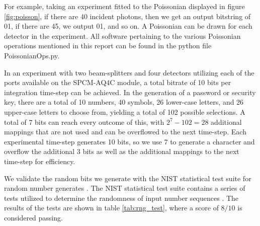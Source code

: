 \documentclass[letterpaper, 11 pt]{article}
\begin{document}
For example, taking an experiment fitted to the Poissonian displayed in figure
\ref{fig:poisson}, if there are 40 incident photons, then we get an output
bitstring of 01, if there are 45, we output 01, and so on. A Poissonian can be
drawn for each detector in the experiment. All software pertaining to the various
Poissonian operations mentioned in this report can be found in the python file PoissonianOps.py.

In an experiment with two beam-splitters and four detectors utilizing each of
the ports available on the SPCM-AQ4C module, a total bitrate of 10 bits per
integration time-step can be achieved. In the generation of a password or
security key, there are a total of 10 numbers, 40 symbols, 26 lower-case
letters, and 26 upper-case letters to choose from, yielding a total of 102
possible selections. A total of 7 bits can reach every outcome of
this, with $2^7 - 102 = 28$ additional mappings that are not used and can be
overflowed to the next time-step. Each experimental time-step generates 10 bits,
so we use 7 to generate a character and overflow the additional 3 bits as well
as the additional mappings to the next time-step for efficiency. 

We validate the random bits we generate with the NIST statistical test suite for
random number generates \cite{nist_sts}. The NIST statistical test suite contains a series of
tests utilized to determine the randomness of input number sequences \cite{sts_intro}. The
results of the tests are shown in table \ref{tab:rng_test}, where a score of
$8/10$ is considered passing.
\end{document}
